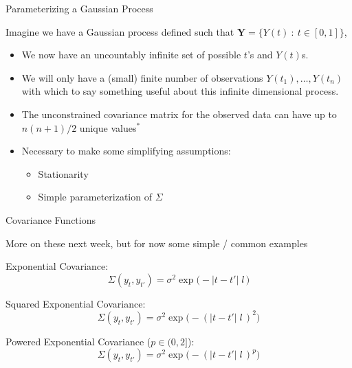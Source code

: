 \documentclass[11pt,ignorenonframetext,]{beamer}
\providecommand{\tightlist}{%
  \setlength{\itemsep}{0pt}\setlength{\parskip}{0pt}}
\begin{document}
\begin{frame}[t]{Parameterizing a Gaussian Process}
\protect\hypertarget{parameterizing-a-gaussian-process}{}

Imagine we have a Gaussian process defined such that
\(\symbf{Y} = \{Y(t) ~:~ t \in [0,1]\}\),

\pause

\begin{itemize}
\tightlist
\item
  We now have an uncountably infinite set of possible \(t\)'s and
  \(Y(t)\)s.
\end{itemize}

\pause

\begin{itemize}
\tightlist
\item
  We will only have a (small) finite number of observations
  \(Y(t_1), \ldots, Y(t_n)\) with which to say something useful about
  this infinite dimensional process.
\end{itemize}

\pause

\begin{itemize}
\tightlist
\item
  The unconstrained covariance matrix for the observed data can have up
  to \(n(n+1)/2\) unique values\(^*\)
\end{itemize}

\pause

\begin{itemize}
\item
  Necessary to make some simplifying assumptions:

  \begin{itemize}
  \item
    Stationarity
  \item
    Simple parameterization of \(\Sigma\)
  \end{itemize}
\end{itemize}

\end{frame}

\begin{frame}{Covariance Functions}
\protect\hypertarget{covariance-functions}{}

More on these next week, but for now some simple / common examples

\pause

Exponential Covariance:
\[ \Sigma(y_{t},y_{t'}) = \sigma^2 \exp\big(-|t-t'| \; l\,\big) \]

\pause

Squared Exponential Covariance:
\[ \Sigma(y_{t},y_{t'}) = \sigma^2 \exp\big(-(|t-t'| \; l\,)^2\big) \]

\pause

Powered Exponential Covariance (\(p \in (0,2]\)):
\[ \Sigma(y_{t},y_{t'}) = \sigma^2 \exp\big(-(|t-t'| \; l\,)^p\big) \]

\end{frame}
\end{document}
